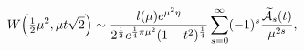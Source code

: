 \[\mathop{W\/}\nolimits\!\left(\tfrac{1}{2}\mu^{2},\mu t\sqrt{2}\right)\sim\frac%
{l(\mu)e^{\mu^{2}\eta}}{2^{\frac{1}{2}}e^{\frac{1}{4}\pi\mu^{2}}(1-t^{2})^{%
\frac{1}{4}}}\*\sum_{s=0}^{\infty}(-1)^{s}\frac{\widetilde{\cal{A}}_{s}(t)}{%
\mu^{2s}},\]